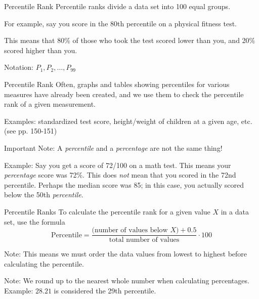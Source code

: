 \documentclass[t, aspectratio=169]{beamer}
\newcommand{\?}{\stackrel{?}{=}}
\begin{document}
	\begin{frame}{Percentile Rank}
		Percentile ranks divide a data set into 100 equal groups. \pause
		
		For example, say you score in the 80th percentile on a physical fitness test. \pause
		
		This means that 80\% of those who took the test scored lower than you, and 20\% scored higher than you. \pause
		
		Notation: $P_1, P_2, \dots, P_{99}$ 
	\end{frame}

	\begin{frame}{Percentile Rank}
		Often, graphs and tables showing percentiles for various measures have already been created, and we use them to check the percentile rank of a given measurement. \pause
		
		Examples: standardized test score, height/weight of children at a given age, etc. (see pp. 150-151) \pause
		
		Important Note: A \textit{percentile} and a \textit{percentage} are not the same thing! \pause
		
		Example: Say you get a score of 72/100 on a math test. This means your \textit{percentage} score was 72\%. This does \textit{not} mean that you scored in the 72nd percentile. Perhaps the median score was 85; in this case, you actually scored below the 50th \textit{percentile}.
	\end{frame}

	\begin{frame}{Percentile Ranks}
		To calculate the percentile rank for a given value $X$ in a data set, use the formula $$\text{Percentile} = \dfrac{\text{(number of values below $X$)} + 0.5}{\text{total number of values}} \cdot 100$$ \pause
		
		Note: This means we must order the data values from lowest to highest before calculating the percentile. \pause
		
		Note: We round up to the nearest whole number when calculating percentages. Example: $28.21$ is considered the 29th percentile.
	\end{frame}
\end{document}
